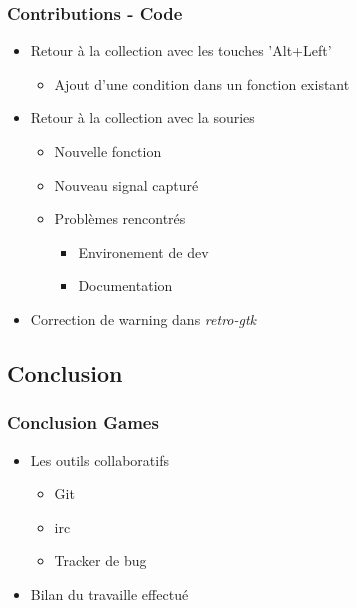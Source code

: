 \documentclass{beamer}
\begin{document}
\begin{frame}
  \frametitle{Contributions - Code}
  \begin{itemize}
  \item Retour à la collection avec les touches 'Alt+Left'
    \begin{itemize}
    \item Ajout d'une condition dans un fonction existant
    \end{itemize}
  \item Retour à la collection avec la souries
    \begin{itemize}
    \item Nouvelle fonction
    \item Nouveau signal capturé
    \item Problèmes rencontrés
      \begin{itemize}
      \item Environement de dev
      \item Documentation
      \end{itemize}
    \end{itemize}
  \item Correction de warning dans \textit{retro-gtk}
  \end{itemize}
\end{frame}

\subsection{Conclusion}
\begin{frame}
  \frametitle{Conclusion Games}
  \begin{itemize}
  \item Les outils collaboratifs
    \begin{itemize}
    \item Git 
    \item irc 
    \item Tracker de bug
    \end{itemize}
  \item Bilan du travaille effectué
  \end{itemize}
\end{frame}
\end{document}
